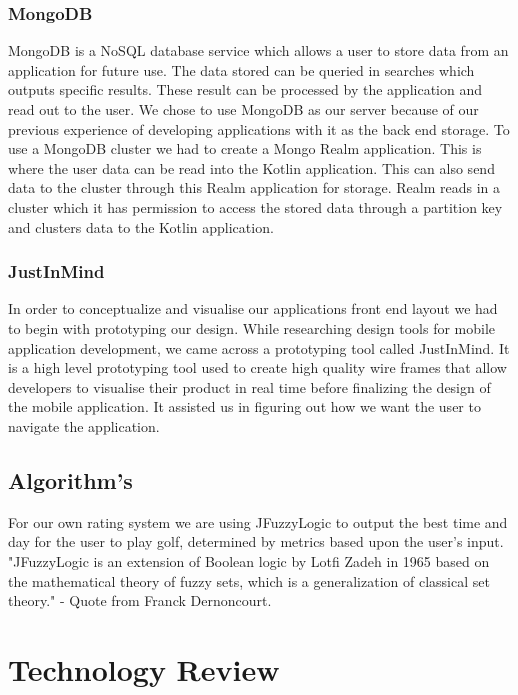 \subsection{MongoDB}
MongoDB is a NoSQL database service which allows a user to store data from an application for future use. The data stored can be queried in searches which outputs specific results. These result can be processed by the application and read out to the user. We chose to use MongoDB as our server because of our previous experience of developing applications with it as the back end storage. 
\newline
\newline
To use a MongoDB cluster we had to create a Mongo Realm application. This is where the user data can be read into the Kotlin application. 
This can also send data to the cluster through this Realm application for storage. Realm reads in a cluster which it has permission to access the stored data through a partition key and clusters data to the Kotlin application.
\subsection{JustInMind}
In order to conceptualize and visualise our applications front end layout we had to begin with prototyping our design. While researching design tools for mobile application development, we came across a prototyping tool called JustInMind.
\newline
It is a high level prototyping tool used to create high quality wire frames that allow developers to visualise their product in real time before finalizing the design of the mobile application. It assisted us in figuring out how we want the user to navigate the application.

\section{Algorithm's}
For our own rating system we are using JFuzzyLogic to output the best time and day for the user to play golf, determined by metrics based upon the user's input. \newline
"JFuzzyLogic is an extension of Boolean logic by Lotfi Zadeh in 1965 based on the mathematical theory of fuzzy sets, which is a generalization of classical set theory." - Quote from Franck Dernoncourt.

\chapter{Technology Review}
